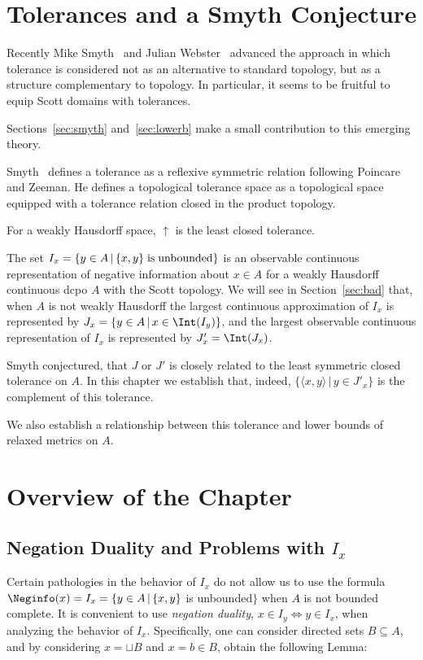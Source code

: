 \section{Tolerances and a Smyth Conjecture}

Recently Mike Smyth~\cite{Smyth2} and Julian Webster~\cite{Webster}
advanced the approach in which tolerance is considered not as
an alternative to standard topology, but as a structure complementary 
to topology. In particular, it seems to be fruitful to equip
Scott domains with tolerances.

Sections~\ref{sec:smyth} 
and~\ref{sec:lowerb} make a small contribution to this emerging
theory.

Smyth~\cite{Smyth2} defines a tolerance as a reflexive symmetric
relation following Poincare and Zeeman. He defines a topological
tolerance space as a topological space equipped with a
tolerance relation closed in the product topology.

For a weakly Hausdorff space, $\uparrow$ is
the least closed tolerance.

The set
$I_x=\{y\in A\,|\, \{x,y\} {\rm \; is \;
unbounded}\}$ is an observable continuous representation of negative
information about $x \in A$
for a weakly Hausdorff continuous dcpo $A$ with the Scott
topology. We will see in Section~\ref{sec:bad} that, 
when $A$ is not weakly Hausdorff the largest continuous
approximation of $I_x$ is represented by
$J_x = \{y\in A\,|\, x \in \Int(I_y)\}$,
and the largest observable continuous representation of $I_x$
is represented by $J'_x = \Int (J_x)$.

Smyth conjectured, that $J$ or $J'$ is closely related to
the least symmetric closed tolerance on $A$. In this chapter we
establish that, indeed, $\{\langle x, y \rangle\,|\, y \in J'_x\}$
is the complement of this tolerance.

We also establish a relationship between this tolerance and
lower bounds of relaxed metrics on $A$.

\section{Overview of the Chapter}

\subsection{Negation Duality and Problems with $I_x$}

Certain pathologies in the behavior of $I_x$ do not allow
us to use the formula 
$\Neginfo(x) = I_x = \{y\in A\,|\,\{x,y\}$ is
unbounded$\}$
when $A$ is not bounded complete.
It is convenient to use {\em negation duality},
$x \in I_y \Leftrightarrow y \in I_x$, when analyzing the behavior
of $I_x$. Specifically, one can consider directed sets $B \subseteq A$,
and by considering $x = \sqcup B$ and $x = b \in B$, obtain the
following Lemma:

